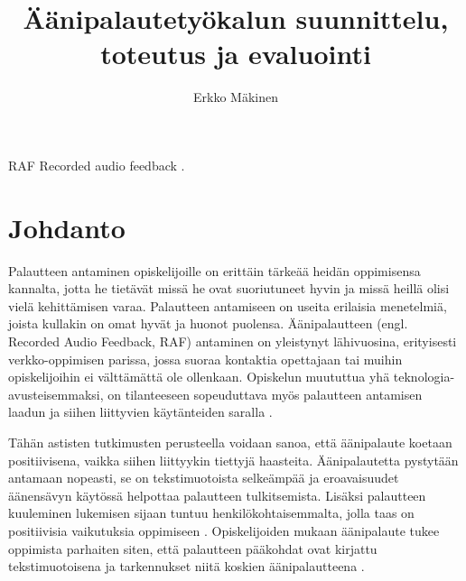 \documentclass[utf8]{gradu3}
\begin{document}
\title{Äänipalautetyökalun suunnittelu, toteutus ja evaluointi}

\author{Erkko Mäkinen}


\maketitle


\begin{thetermlist}
\item[RAF] Recorded audio feedback \parencite[ks.][]{using}. 
\end{thetermlist}

\mainmatter

\chapter{Johdanto}

Palautteen antaminen opiskelijoille on erittäin tärkeää heidän oppimisensa kannalta, jotta he tietävät missä he ovat suoriutuneet hyvin ja missä heillä olisi vielä kehittämisen varaa. Palautteen antamiseen on useita erilaisia menetelmiä, joista kullakin on omat hyvät ja huonot puolensa. Äänipalautteen (engl. Recorded Audio Feedback, RAF) antaminen on yleistynyt lähivuosina, erityisesti verkko-oppimisen parissa, jossa suoraa kontaktia opettajaan tai muihin opiskelijoihin ei välttämättä ole ollenkaan. Opiskelun muututtua yhä teknologia-avusteisemmaksi, on tilanteeseen sopeuduttava myös palautteen antamisen laadun ja siihen liittyvien käytänteiden saralla \parencite[][]{cavanaugh2014}.

Tähän astisten tutkimusten perusteella voidaan sanoa, että äänipalaute koetaan positiivisena, vaikka siihen liittyykin tiettyjä haasteita. Äänipalautetta pystytään antamaan nopeasti, se on tekstimuotoista selkeämpää ja eroavaisuudet äänensävyn käytössä helpottaa palautteen tulkitsemista. Lisäksi palautteen kuuleminen lukemisen sijaan tuntuu henkilökohtaisemmalta, jolla taas on positiivisia vaikutuksia oppimiseen \parencite[][]{moderating}. Opiskelijoiden mukaan äänipalaute tukee oppimista parhaiten siten, että palautteen pääkohdat ovat kirjattu tekstimuotoisena ja tarkennukset niitä koskien äänipalautteena \parencite[][]{using}.
\end{document}
